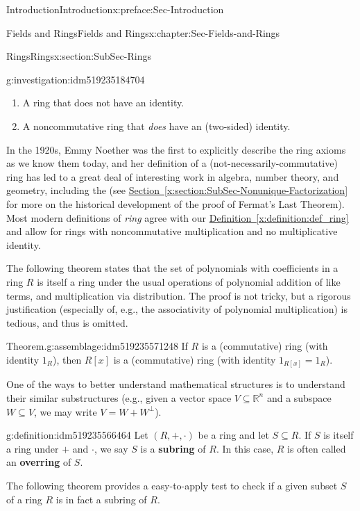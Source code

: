 \documentclass[oneside,10pt,]{book}
\newcommand{\xreffont}{\relax}
\newcommand{\terminology}[1]{\textbf{#1}}
\numberwithin{equation}{section}
\def\R{{\mathbb R}}
\begin{document}
\begin{preface}{Introduction}{}{Introduction}{}{}{x:preface:Sec-Introduction}
\begin{chapterptx}{Fields and Rings}{}{Fields and Rings}{}{}{x:chapter:Sec-Fields-and-Rings}
\begin{sectionptx}{Rings}{}{Rings}{}{}{x:section:SubSec-Rings}
\begin{investigation}{}{g:investigation:idm519235184704}
\begin{enumerate}
\item{}A ring that does not have an identity\footnotemark{}.%
\item{}A noncommutative ring that \emph{does} have an (two-sided) identity.%
\end{enumerate}
%
\end{investigation}
%
In the 1920s, Emmy Noether was the first to explicitly describe the ring axioms as we know them today, and her definition of a (not-necessarily-commutative) ring has led to a great deal of interesting work in algebra, number theory, and geometry, including the (see \hyperref[x:section:SubSec-Nonunique-Factorization]{Section~{\xreffont\ref{x:section:SubSec-Nonunique-Factorization}}} for more on the historical development of the proof of Fermat's Last Theorem). Most modern definitions of \emph{ring} agree with our \hyperref[x:definition:def_ring]{Definition~{\xreffont\ref{x:definition:def_ring}}} and allow for rings with noncommutative multiplication and no multiplicative identity.%
\par
The following theorem states that the set of polynomials with coefficients in a ring \(R\) is itself a ring under the usual operations of polynomial addition of like terms, and multiplication via distribution. The proof is not tricky, but a rigorous justification (especially of, e.g., the associativity of polynomial multiplication) is tedious, and thus is omitted.%
\begin{assemblage}{Theorem.}{g:assemblage:idm519235571248}%
If \(R\) is a (commutative) ring (with identity \(1_R\)), then \(R[x]\) is a (commutative) ring (with identity \(1_{R[x]} = 1_R\)).%
\end{assemblage}
One of the ways to better understand mathematical structures is to understand their similar substructures (e.g., given a vector space \(V\subseteq \R^n\) and a subspace \(W\subseteq V\), we may write \(V = W + W^\perp\)). %
\begin{definition}{}{g:definition:idm519235566464}%
%
%
Let \((R,+,\cdot)\) be a ring and let \(S\subseteq R\). If \(S\) is itself a ring under \(+\) and \(\cdot\), we say \(S\) is a \terminology{subring} of \(R\). In this case, \(R\) is often called an \terminology{overring} of \(S\).%
\end{definition}
The following theorem provides a easy-to-apply test to check if a given subset \(S\) of a ring \(R\) is in fact a subring of \(R\).%

\end{sectionptx}
\end{chapterptx}
\end{preface}
\end{document}
